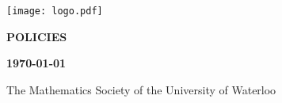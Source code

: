 \documentclass[11pt]{article}
\begin{document}
\begin{titlepage}\begin{center}
\sffamily
\texttt{[image: logo.pdf]}

\vspace{10em}

{\Huge \bfseries POLICIES}

\vspace{3em}

{\LARGE \bfseries \today}

\vspace{7em}

{\LARGE The Mathematics Society of the University of Waterloo}
\end{center}\end{titlepage}

{\large \sffamily \tableofcontents}








\end{document}
